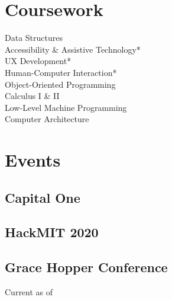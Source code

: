\documentclass[]{hieudo-build}
\begin{document}
\begin{minipage}[t]{0.34\textwidth}
\section{Coursework}
Data Structures \\
Accessibility \& Assistive Technology* \\
UX Development* \\
Human-Computer Interaction* \\
Object-Oriented Programming \\
Calculus I \& II \\
Low-Level Machine Programming \\
Computer Architecture \\
\smallsectionsep
{}
\sectionsep

\section{Events}
\subsection{Capital One} 
\smallsectionsep
\subsection{HackMIT 2020}
\smallsectionsep
\subsection{Grace Hopper Conference}

\vspace{3.5em} %
Current as of 

%
%
\end{minipage} 
\hfill
\end{document}

